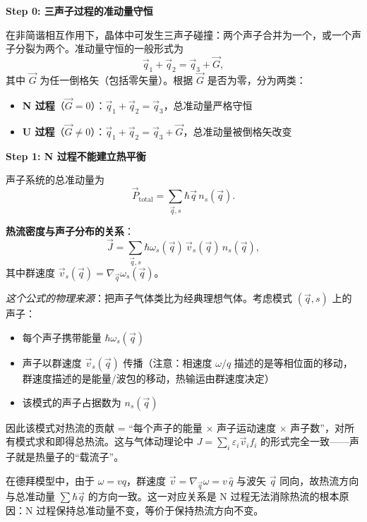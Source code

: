 \begin{derivationbox}[标准解题过程]
\textbf{Step 0: 三声子过程的准动量守恒}

在非简谐相互作用下，晶体中可发生三声子碰撞：两个声子合并为一个，或一个声子分裂为两个。准动量守恒的一般形式为
\begin{equation}
\vec q_1+\vec q_2=\vec q_3+\vec G,
\end{equation}
其中 $\vec G$ 为任一倒格矢（包括零矢量）。根据 $\vec G$ 是否为零，分为两类：

\begin{itemize}
    \item \textbf{N 过程}（$\vec G=0$）：$\vec q_1+\vec q_2=\vec q_3$，总准动量严格守恒
    \item \textbf{U 过程}（$\vec G\neq0$）：$\vec q_1+\vec q_2=\vec q_3+\vec G$，总准动量被倒格矢改变
\end{itemize}

\textbf{Step 1: N 过程不能建立热平衡}

声子系统的总准动量为
\begin{equation}
\vec P_{\text{total}}=\sum_{\vec q,s}\hbar\vec q\,n_s(\vec q).
\end{equation}

\textbf{热流密度与声子分布的关系}：
\begin{equation}
\vec J=\sum_{\vec q,s}\hbar\omega_s(\vec q)\,\vec v_s(\vec q)\,n_s(\vec q),
\label{eq:heat-current}
\end{equation}
其中群速度 $\vec v_s(\vec q)=\nabla_{\vec q}\omega_s(\vec q)$。

\textit{这个公式的物理来源}：把声子气体类比为经典理想气体。考虑模式 $(\vec q,s)$ 上的声子：
\begin{itemize}
    \item 每个声子携带能量 $\hbar\omega_s(\vec q)$
    \item 声子以群速度 $\vec v_s(\vec q)$ 传播（注意：相速度 $\omega/q$ 描述的是等相位面的移动，群速度描述的是能量/波包的移动，热输运由群速度决定）
    \item 该模式的声子占据数为 $n_s(\vec q)$
\end{itemize}
因此该模式对热流的贡献 = ``每个声子的能量 $\times$ 声子运动速度 $\times$ 声子数''，对所有模式求和即得总热流。这与气体动理论中 $J=\sum_i \varepsilon_i\vec v_i f_i$ 的形式完全一致——声子就是热量子的``载流子''。

在德拜模型中，由于 $\omega=vq$，群速度 $\vec v=\nabla_{\vec q}\omega=v\,\hat q$ 与波矢 $\vec q$ 同向，故热流方向与总准动量 $\sum\hbar\vec q$ 的方向一致。这一对应关系是 N 过程无法消除热流的根本原因：N 过程保持总准动量不变，等价于保持热流方向不变。


\end{derivationbox}
